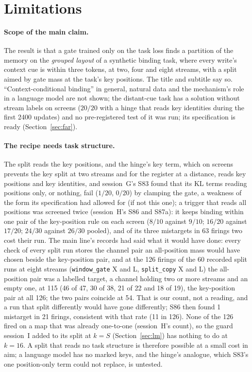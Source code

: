 \documentclass[11pt]{article}
\begin{document}
\section{Limitations}
\label{sec:limits}

\paragraph{Scope of the main claim.} The result is that a gate trained only on the task loss finds a partition of the memory on the \emph{grouped layout} of a synthetic binding task, where every write's context cue is within three tokens, at two, four and eight streams, with a split aimed by gate mass at the task's key positions. The title and subtitle say so. ``Context-conditional binding'' in general, natural data and the mechanism's role in a language model are not shown; the distant-cue task has a solution without stream labels on screens ($20/20$ with a hinge that reads key identities during the first 2400 updates) and no pre-registered test of it was run; its specification is ready (Section~\ref{sec:far}).

\paragraph{The recipe needs task structure.} The split reads the key positions, and the hinge's key term, which on screens prevents the key split at two streams and for the register at a distance, reads key positions and key identities, and session~G's S83 found that its KL terms reading positions only, or nothing, fail ($1/20$, $0/20$) by clamping the gate, a weakness of the form its specification had allowed for (if not this one); a trigger that reads all positions was screened twice (session~H's S86 and S87a): it keeps binding within one pair of the key-position rule on each screen ($8/10$ against $9/10$; $16/20$ against $17/20$; $24/30$ against $26/30$ pooled), and of its three mistargets in 63 firings two cost their run. The main line's records had said what it would have done: every check of every split run stores the channel pair an all-position mass would have chosen beside the key-position pair, and at the 126 firings of the 60 recorded split runs at eight streams (\texttt{window\_gate} X and L, \texttt{split\_copy} X and L) the all-position pair was a labelled target, a channel holding two or more streams and an empty one, at 115 (46 of 47, 30 of 38, 21 of 22 and 18 of 19), the key-position pair at all 126; the two pairs coincide at 54. That is our count, not a reading, and a run that split differently would have gone differently; S86 then found 1 mistarget in 21 firings, consistent with that rate (11 in 126). None of the 126 fired on a map that was already one-to-one (session~H's count), so the guard session~I added to its split at $k = S$ (Section~\ref{sec:lm}) has nothing to do at $k = 16$. A split that reads no task structure is therefore possible at a small cost in aim; a language model has no marked keys, and the hinge's analogue, which S83's one position-only term could not replace, is untested.
\end{document}
